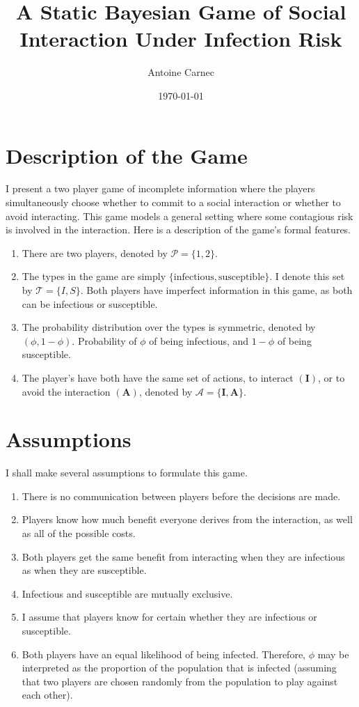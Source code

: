 \documentclass{article}
\title{A Static Bayesian Game of Social Interaction Under Infection Risk}
\author{Antoine Carnec \;\; 17329720}
\date{\today}
\theoremstyle{definition}
\theoremstyle{exercise}
\theoremstyle{remark}
\begin{document}
\maketitle
\noindent

\section{Description of the Game} %
I present a two player game of incomplete information where the players simultaneously choose whether to commit to a social interaction or whether to avoid interacting. 
This game models a general setting where some contagious risk is involved in the interaction.
Here is a description of the game's formal features.
\begin{enumerate}[1.]
    \item There are two players, denoted by $\mathcal{P} = \{1,2\}$.
    \item The types in the game are simply $\{\text{infectious},\text{susceptible}\}$. I denote this set by $\mathcal{T} = \{I, S\}$. Both players have imperfect information in this game, as both can be infectious or susceptible.
    \item The probability distribution over the types is symmetric, denoted by $(\phi, 1 - \phi)$. Probability of $\phi$ of being infectious, and $1 - \phi$ of being susceptible.
    \item The player's have both have the same set of actions, to interact $(\bm{I})$, or to avoid the interaction $(\bm{A})$, denoted by $\mathcal{A} = \{ \bm{I}, \bm{A}\}$.
\end{enumerate}


\section{Assumptions}
I shall make several assumptions to formulate this game.
\begin{enumerate}[1.]
    \item There is no communication between players before the decisions are made.
    \item Players know how much benefit everyone derives from the interaction, as well as all of the possible costs.
    \item Both players get the same benefit from interacting when they are infectious as when they are susceptible.
    \item Infectious and susceptible are mutually exclusive.
    \item I assume that players know for certain whether they are infectious or susceptible.
    \item Both players have an equal likelihood of being infected. Therefore, $\phi$ may be interpreted as the proportion of the population that is infected (assuming that two players are chosen randomly from the population to play against each other).
\end{enumerate}
\end{document}
